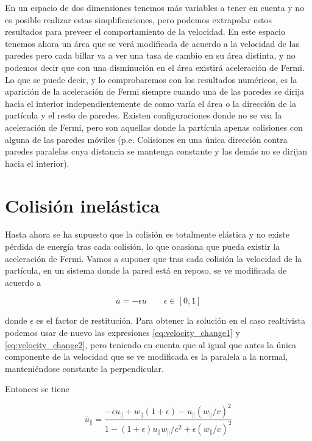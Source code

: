En un espacio de dos dimensiones tenemos más variables a tener en cuenta y no es posible realizar estas simplificaciones, pero podemos extrapolar estos resultados para preveer el comportamiento de la velocidad. En este espacio tenemos ahora un área que se verá modificada de acuerdo a la velocidad de las paredes pero cada billar va a ver una tasa de cambio en su área distinta, y no podemos decir que con una disminución en el área existirá aceleración de Fermi. Lo que se puede decir, y lo comprobaremos con los resultados numéricos, es la aparición de la aceleración de Fermi siempre cuando una de las paredes se dirija hacia el interior independientemente de como varía el área o la dirección de la partícula y el resto de paredes. Existen configuraciones donde no se vea la aceleración de Fermi, pero son aquellas donde la partícula apenas colisiones con alguna de las paredes móviles (p.e. Colisiones en una única dirección contra paredes paralelas cuya distancia se mantenga constante y las demás no se dirijan hacia el interior).

\section{Colisión inelástica}

Hasta ahora se ha supuesto que la colisión es totalmente elástica y no existe pérdida de energía tras cada colisión, lo que ocasiona que pueda existir la aceleración de Fermi. Vamos a suponer que tras cada colisión la velocidad de la partícula, en un sistema donde la pared está en reposo, se ve modificada de acuerdo a 

\begin{equation}
    \bar{u} = -\epsilon u \qquad \epsilon \in \left[ 0, 1 \right]
\end{equation}

donde \( \epsilon \) es el factor de restitución. Para obtener la solución en el caso realtivista podemos usar de nuevo las expresiones \ref{eq:velocity_change1} y \ref{eq:velocity_change2}, pero teniendo en cuenta que al igual que antes la única componente de la velocidad que se ve modificada es la paralela a la normal, manteniéndose constante la perpendicular. 

\vspace{3mm}

Entonces se tiene

\begin{equation}
    \bar{u}_\parallel = \dfrac{-\epsilon u_\parallel + w_\parallel (1 + \epsilon) -  u_\parallel (w_\parallel/c)^2}{1 - (1 + \epsilon)u_\parallel w_\parallel/c^2 + \epsilon (w_\parallel/c)^2}
\end{equation}

